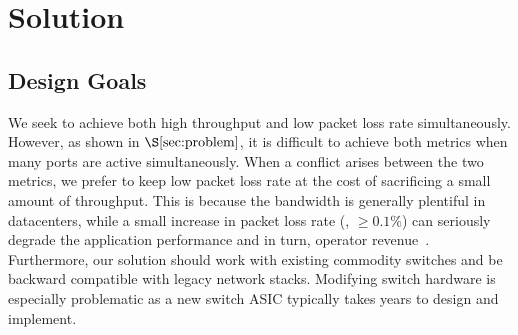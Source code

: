 \section{Solution}\label{sec:design}
\vspace{-2mm}
\subsection{Design Goals}\label{subsec:design_goals}
We seek to achieve both high throughput and low packet loss rate simultaneously. However, as shown in $\S\ref{sec:problem}$, it is difficult to achieve both metrics when many ports are active simultaneously. When a conflict arises between the two metrics, we prefer to keep low packet loss rate at the cost of sacrificing a small amount of throughput. This is because the bandwidth is generally plentiful in datacenters, while a small increase in packet loss rate (\eg, $\geq0.1\%$) can seriously degrade the application performance and in turn, operator revenue~\cite{timely}. Furthermore, our solution should work with existing commodity switches and be backward compatible with legacy network stacks. Modifying switch hardware is especially problematic as a new switch ASIC typically takes years to design and implement.


